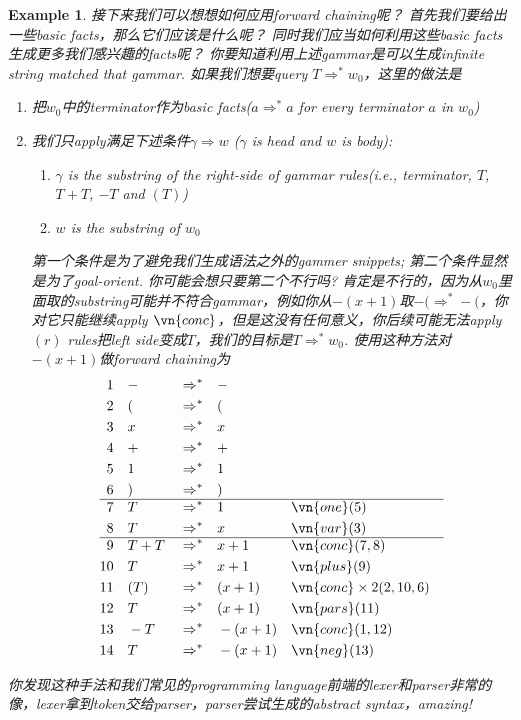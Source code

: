 \documentclass{article}
\theoremstyle{plain}
\newtheorem{example}[theorem]{Example}
\theoremstyle{nonumberplain}
\begin{document}
\begin{example}
接下来我们可以想想如何应用forward chaining呢？ 首先我们要给出一些basic facts，那么它们应该是什么呢？ 同时我们应当如何利用这些basic facts生成更多我们感兴趣的facts呢？ 你要知道利用上述gammar是可以生成infinite string matched that gammar. 如果我们想要query $T \Rightarrow^* w_0$，这里的做法是
\begin{enumerate}
	\item 把$w_0$中的terminator作为basic facts($a \Rightarrow^* a$ for every terminator $a$ in $w_0$)
	\item 我们只apply满足下述条件$\gamma \Rightarrow w$ ($\gamma$ is head and $w$ is body):
	\begin{enumerate}
		\item $\gamma$ is the substring of the right-side of gammar rules(i.e.,  terminator, $T$, $T+T$, $-T$ and $(T)$)
		\item $w$ is the substring of $w_0$ 
	\end{enumerate}
	第一个条件是为了避免我们生成语法之外的gammer snippets; 第二个条件显然是为了goal-orient. 你可能会想只要第二个不行吗? 肯定是不行的，因为从$w_0$里面取的substring可能并不符合gammar，例如你从$-(x+1)$取$-( \Rightarrow^* -($，你对它只能继续apply $\vn{conc}$，但是这没有任何意义，你后续可能无法apply $(r)$ rules把left side变成$T$，我们的目标是$T \Rightarrow^* w_0$. 使用这种方法对$-(x+1)$做forward chaining为
	\[
		\begin{aligned}
		1 &&&  - && \Rightarrow^* && - \\
		2 &&&  ( && \Rightarrow^* && ( \\
		3 &&&  x && \Rightarrow^* && x \\
		4 &&&  + && \Rightarrow^* && + \\
		5 &&&  1 && \Rightarrow^* && 1 \\
		6 &&&  ) && \Rightarrow^* && ) \\
		\hline 
		7 &&&  T && \Rightarrow^* && 1 && \vn{one}(5) \\
		8 &&&  T && \Rightarrow^* && x && \vn{var}(3)\\
		\hline
		9 &&&  T+T && \Rightarrow^* && x+1 && \vn{conc}(7,8) \\
		10 &&&  T && \Rightarrow^* && x+1 && \vn{plus}(9)\\
		11 &&&  (T) && \Rightarrow^* && (x+1) && \vn{conc} \times 2(2,10,6)\\
		12 &&&  T && \Rightarrow^* && (x+1) && \vn{pars}(11) \\
		13 &&&  -T && \Rightarrow^* && -(x+1) && \vn{conc}(1,12) \\
		14 &&&  T && \Rightarrow^* && -(x+1) && \vn{neg}(13)\\
		\end{aligned}
	\]
\end{enumerate}
你发现这种手法和我们常见的programming language前端的lexer和parser非常的像，lexer拿到token交给parser，parser尝试生成的abstract syntax，amazing! 


\end{example}
\end{document}
